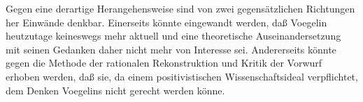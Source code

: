 
Gegen eine derartige Herangehensweise sind von zwei gegensätzlichen Richtungen
her Einwände denkbar. Einerseits könnte eingewandt werden, daß Voegelin
heutzutage keineswegs mehr aktuell und eine theoretische Auseinandersetzung
mit seinen Gedanken daher nicht mehr von Interesse sei. Andererseits könnte
gegen die Methode der rationalen Rekonstruktion und Kritik der Vorwurf erhoben
werden, daß sie, da einem positivistischen Wissenschaftsideal verpflichtet,
dem Denken Voegelins nicht gerecht werden könne.

